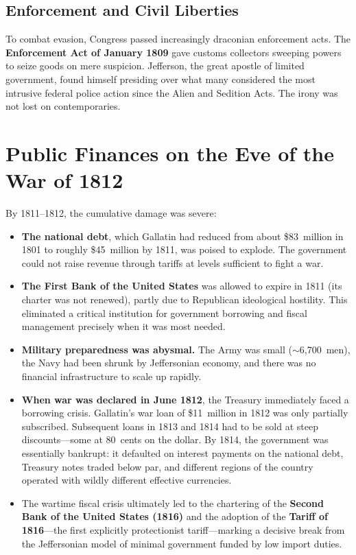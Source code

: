 \documentclass[12pt]{article}
\begin{document}
\subsection{Enforcement and Civil Liberties}

To combat evasion, Congress passed increasingly draconian enforcement acts. The
\textbf{Enforcement Act of January 1809} gave customs collectors sweeping powers
to seize goods on mere suspicion. Jefferson, the great apostle of limited
government, found himself presiding over what many considered the most intrusive
federal police action since the Alien and Sedition Acts. The irony was not lost
on contemporaries.

\section{Public Finances on the Eve of the War of 1812}

By 1811--1812, the cumulative damage was severe:

\begin{itemize}
    \item \textbf{The national debt}, which Gallatin had reduced from about
    \$83~million in 1801 to roughly \$45~million by 1811, was poised to
    explode. The government could not raise revenue through tariffs at levels
    sufficient to fight a war.

    \item \textbf{The First Bank of the United States} was allowed to expire in
    1811 (its charter was not renewed), partly due to Republican ideological
    hostility. This eliminated a critical institution for government borrowing
    and fiscal management precisely when it was most needed.

    \item \textbf{Military preparedness was abysmal.} The Army was small
    ($\sim$6,700~men), the Navy had been shrunk by Jeffersonian economy, and
    there was no financial infrastructure to scale up rapidly.

    \item \textbf{When war was declared in June 1812}, the Treasury immediately
    faced a borrowing crisis. Gallatin's war loan of \$11~million in 1812 was
    only partially subscribed. Subsequent loans in 1813 and 1814 had to be sold
    at steep discounts---some at 80~cents on the dollar. By 1814, the government
    was essentially bankrupt: it defaulted on interest payments on the national
    debt, Treasury notes traded below par, and different regions of the country
    operated with wildly different effective currencies.

    \item The wartime fiscal crisis ultimately led to the chartering of the
    \textbf{Second Bank of the United States (1816)} and the adoption of the
    \textbf{Tariff of 1816}---the first explicitly protectionist tariff---marking
    a decisive break from the Jeffersonian model of minimal government funded by
    low import duties.
\end{itemize}
\end{document}
